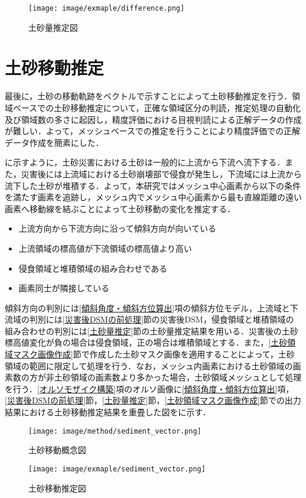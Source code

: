     \begin{figure}[t]
      \centering
      \texttt{[image: image/exmaple/difference.png]}
      \caption{土砂量推定図}
      \label{土砂量推定結果}
    \end{figure}



  \section{土砂移動推定}
    \label{土砂移動推定}
    最後に，土砂の移動軌跡をベクトルで示すことによって土砂移動推定を行う．領域ベースでの土砂移動推定について，正確な領域区分の判読，推定処理の自動化及び領域数の多さに起因し，精度評価における目視判読による正解データの作成が難しい．よって，メッシュベースでの推定を行うことにより精度評価での正解データ作成を簡素にした．

    に示すように，土砂災害における土砂は一般的に上流から下流へ流下する．また，災害後には上流域における土砂崩壊部で侵食が発生し，下流域には上流から流下した土砂が堆積する\cite{土砂量解析5}．よって，本研究ではメッシュ中心画素から以下の条件を満たす画素を追跡し，メッシュ内でメッシュ中心画素から最も直線距離の遠い画素へ移動線を結ぶことによって土砂移動の変化を推定する．

    \begin{itemize}
      \setlength{\itemsep}{-5pt}
      \item 上流方向から下流方向に沿って傾斜方向が向いている
      \item 上流領域の標高値が下流領域の標高値より高い
      \item 侵食領域と堆積領域の組み合わせである
      \item 画素同士が隣接している
    \end{itemize}

    傾斜方向の判別には\ref{傾斜角度・傾斜方位算出}項の傾斜方位モデル，上流域と下流域の判別には\ref{災害後DSMの前処理}節の災害後DSM，侵食領域と堆積領域の組み合わせの判別には\ref{土砂量推定}節の土砂量推定結果を用いる．災害後の土砂標高値変化が負の場合は侵食領域，正の場合は堆積領域とする．また，\ref{土砂領域マスク画像作成}節で作成した土砂マスク画像を適用することによって，土砂領域の範囲に限定して処理を行う．なお，メッシュ内画素における土砂領域の画素数の方が非土砂領域の画素数より多かった場合，土砂領域メッシュとして処理を行う．\ref{オルソモザイク構築}項のオルソ画像に\ref{傾斜角度・傾斜方位算出}項，\ref{災害後DSMの前処理}節，\ref{土砂量推定}節，\ref{土砂領域マスク画像作成}節での出力結果における土砂移動推定結果を重畳した図をに示す．
    
    \begin{figure}[t]
      \centering
      \texttt{[image: image/method/sediment\_vector.png]}
      \caption{土砂移動概念図}
      \label{土砂移動概念図}
    \end{figure}

    \begin{figure}[t]
      \centering
      \texttt{[image: image/exmaple/sediment\_vector.png]}
      \caption{土砂移動推定図}
      \label{土砂移動推定結果}
    \end{figure}
  
